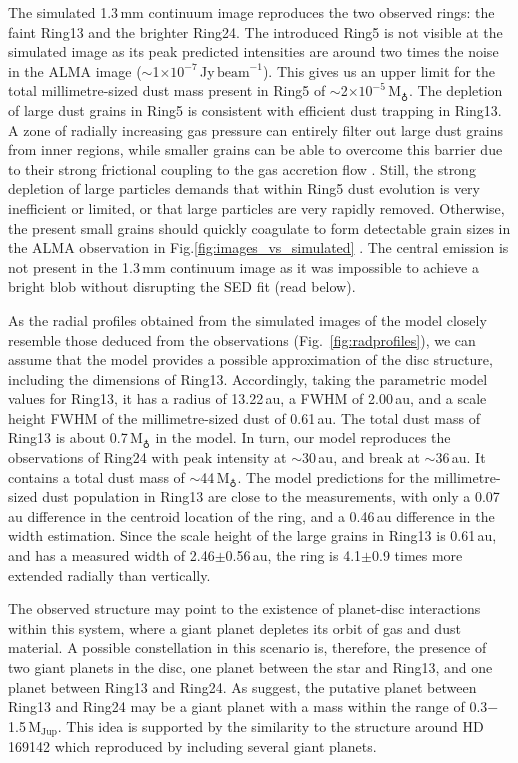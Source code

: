 \documentclass[fleqn,usenatbib,useAMS]{mnras}
\begin{document}
The simulated 1.3\,mm continuum image reproduces the two observed rings: the faint Ring13 and the brighter Ring24. The introduced Ring5 is not visible at the simulated image as its peak predicted intensities are around two times the noise in the ALMA image ($\sim$1$\times10^{-7}$\,Jy\,$\mathrm{beam}^{-1}$). This gives us an upper limit for the total millimetre-sized dust mass present in Ring5 of $\sim$2$\times10^{-5}$\,M$_{\earth}$. The depletion of large dust grains in Ring5 is consistent with efficient dust trapping in Ring13. A zone of radially increasing gas pressure can entirely filter out large dust grains from inner regions, while smaller grains can be able to overcome this barrier due to their strong frictional coupling to the gas accretion flow \citep[studied in the context of planetary gaps,][]{Rice2006,Zhu2012,Weber2018}. Still, the strong depletion of large particles demands that within Ring5 dust evolution is very inefficient or limited, or that large particles are very rapidly removed. Otherwise, the present small grains should quickly coagulate to form detectable grain sizes in the ALMA observation in Fig.\ref{fig:images_vs_simulated}  \citep{Drazkowska2019}. The central emission is not present in the 1.3\,mm continuum image as it was impossible to achieve a bright blob without disrupting the SED fit (read below).

As the radial profiles obtained from the simulated images of the model closely resemble those deduced from the observations (Fig.~\ref{fig:radprofiles}), we can assume that the model provides a possible approximation of the disc structure, including the dimensions of Ring13. Accordingly, taking the parametric model values for Ring13, it has a radius of 13.22\,au, a FWHM of 2.00\,au, and a scale height FWHM of the millimetre-sized dust of 0.61\,au. The total dust mass of Ring13 is about 0.7\,M$_{\earth}$ in the model. In turn, our model reproduces the observations of Ring24 with peak intensity at $\sim$30\,au, and break at $\sim$36\,au. It contains a total dust mass of $\sim$44\,M$_{\earth}$. The model predictions for the millimetre-sized dust population in Ring13 are close to the measurements, with only a 0.07\,au difference in the centroid location of the ring, and a 0.46\,au difference in the width estimation. Since  the  scale height of the large grains in Ring13 is  0.61\,au, and has a  measured width of 2.46$\pm$0.56\,au, the ring is 4.1$\pm$0.9 times more extended radially than vertically.

The observed structure may point to the existence of planet-disc interactions within this system, where a giant planet depletes its orbit of gas and dust material. A possible  constellation in this scenario is, therefore, the presence of two giant planets in the disc, one planet between the star and Ring13, and one planet between Ring13 and Ring24. As \citet{Ru_z_Rodr_guez_2019} suggest, the putative planet between Ring13 and Ring24 may be a giant planet with a mass within the range of 0.3$-$1.5\,$\mathrm{M}_{\mathrm{Jup}}$. This idea is supported by the similarity to the structure around HD\,169142 which \citet{2020arXiv200711565B} reproduced by including several giant planets. 
\end{document}
